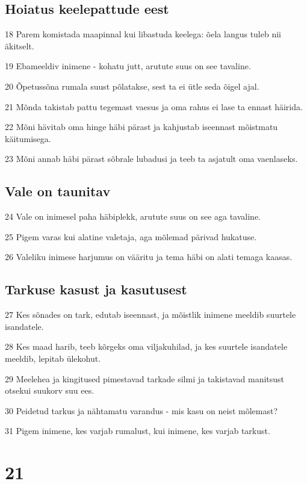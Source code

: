 \section*{Hoiatus keelepattude eest}

\par 18 Parem komistada maapinnal kui libastuda keelega: õela langus tuleb nii äkitselt.
\par 19 Ebameeldiv inimene - kohatu jutt, arutute suus on see tavaline.
\par 20 Õpetussõna rumala suust põlatakse, sest ta ei ütle seda õigel ajal.
\par 21 Mõnda takistab pattu tegemast vaesus ja oma rahus ei lase ta ennast häirida.
\par 22 Mõni hävitab oma hinge häbi pärast ja kahjustab iseennast mõistmatu käitumisega.
\par 23 Mõni annab häbi pärast sõbrale lubadusi ja teeb ta asjatult oma vaenlaseks.

\section*{Vale on taunitav}

\par 24 Vale on inimesel paha häbiplekk, arutute suus on see aga tavaline.
\par 25 Pigem varas kui alatine valetaja, aga mõlemad pärivad hukatuse.
\par 26 Valeliku inimese harjumus on vääritu ja tema häbi on alati temaga kaasas.

\section*{Tarkuse kasust ja kasutusest}

\par 27 Kes sõnades on tark, edutab iseennast, ja mõistlik inimene meeldib suurtele isandatele.
\par 28 Kes maad harib, teeb kõrgeks oma viljakuhilad, ja kes suurtele isandatele meeldib, lepitab ülekohut.
\par 29 Meelehea ja kingitused pimestavad tarkade silmi ja takistavad manitsust otsekui suukorv suu ees.
\par 30 Peidetud tarkus ja nähtamatu varandus - mis kasu on neist mõlemast?
\par 31 Pigem inimene, kes varjab rumalust, kui inimene, kes varjab tarkust.

\chapter{21}

